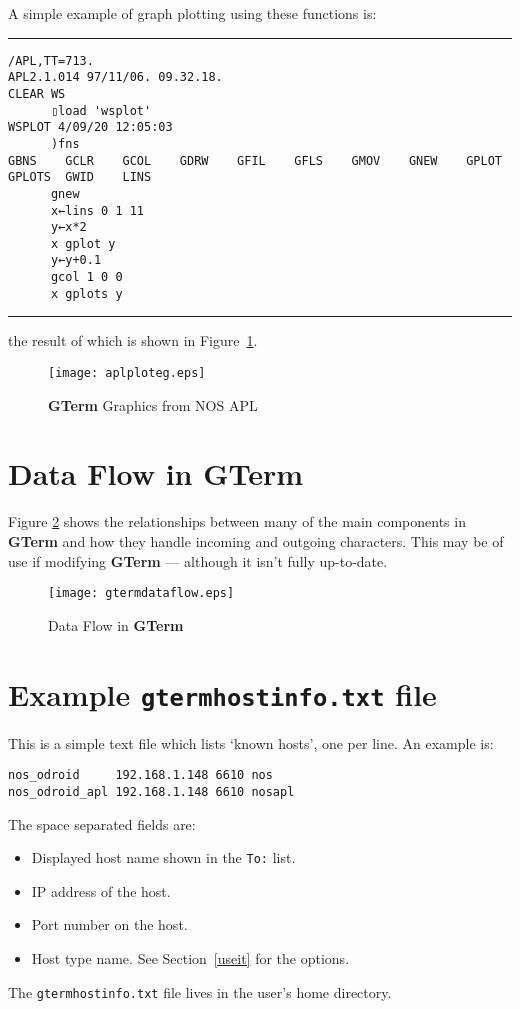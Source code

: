 \documentclass[a4paper,twoside,11pt]{article}
\makeatletter
\def\maxwidth{%
  \ifdim\Gin@nat@width>\linewidth
    \linewidth
  \else
    \Gin@nat@width
  \fi
}
\newcommand{\newpara}{\par\vspace{4mm}\noindent}
\makeatother
\begin{document}
\newpara
A simple example of graph plotting using these functions is:
\newpara
\hrule
{\scriptsize
\begin{verbatim}
/APL,TT=713.
APL2.1.014 97/11/06. 09.32.18.
CLEAR WS
      ▯load 'wsplot'
WSPLOT 4/09/20 12:05:03
      )fns
GBNS    GCLR    GCOL    GDRW    GFIL    GFLS    GMOV    GNEW    GPLOT   GPLOTS  GWID    LINS
      gnew
      x←lins 0 1 11
      y←x*2
      x gplot y
      y←y+0.1
      gcol 1 0 0
      x gplots y
\end{verbatim}
}
\hrule
\newpara
the result of which is shown in Figure~\ref{fig:graf2}.

\begin{figure}
	\centering
		\texttt{[image: aplploteg.eps]}
	\caption{\textbf{GTerm} Graphics from NOS APL}
	\label{fig:graf2}
\end{figure}


\section{Data Flow in \textbf{GTerm}}
Figure \ref{fig:dataflow} shows the relationships between many of the
main components in \textbf{GTerm} and how they handle incoming and outgoing characters.
This may be of use if modifying \textbf{GTerm} --- although it isn't fully up-to-date.

\begin{figure}
	\centering
		\texttt{[image: gtermdataflow.eps]}
	\caption{Data Flow in \textbf{GTerm}}
	\label{fig:dataflow}
\end{figure}

\section{Example \texttt{gtermhostinfo.txt} file}
This is a simple text file which lists `known hosts', one per line. An example is:
\begin{lstlisting}
nos_odroid     192.168.1.148 6610 nos
nos_odroid_apl 192.168.1.148 6610 nosapl
\end{lstlisting}
The space separated fields are: 
\begin{itemize}
\item  Displayed host name shown in the \texttt{To:} list.
\item IP address of the host.
\item Port number on the host.
\item Host type name. See Section~\ref{useit} for the options.
\end{itemize}

\newpara
The \texttt{gtermhostinfo.txt} file lives in the user's home directory.
\end{document}
